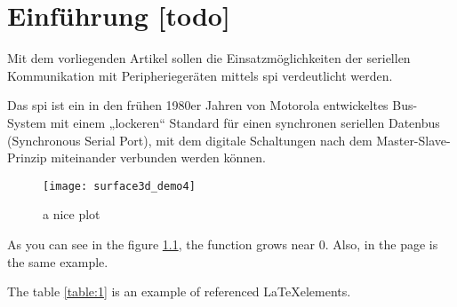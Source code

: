 \begin{comment}
- \cite{kurth2003experimental}
	- Many tasks for which robots are seemingly well-suited require a high level of precision in localization before such application can occur in the eld. For ex-ample, a robot delivering mail in an oÆce building, moving plants in a greenhouse, or mapping an under-ground mine needs to maintain an accurate estimate of its location.
	- Originally intended as a means to track assets and people in an environment equipped with special RF transponders [13], we invert the paradigm by xing the tags in the environment and moving a transponder with a robot. In this paradigm, as the robot moves, it periodically sends out a query, and any tags within range respond by sending a reply.
	- The ad-vantage of such a method is that it does not require line of sight between tags and the mobile robot, mak-ing it useful in many environmental conditions that fail optical methods.
	- Note that, since each tag transmits a unique ID number, distance readings are automatically associated with the appropriate tags, so the data association problem is solved trivially.
	
\end{comment}



\chapter{Einführung [todo]}

Mit dem vorliegenden Artikel sollen die Einsatzmöglichkeiten der seriellen Kommunikation mit Peripheriegeräten mittels \gls{spi} verdeutlicht werden.

Das \gls{spi} ist ein in den frühen 1980er Jahren von Motorola entwickeltes Bus-System mit einem „lockeren“ Standard für einen synchronen seriellen Datenbus (Synchronous Serial Port), mit dem digitale Schaltungen nach dem Master-Slave-Prinzip miteinander verbunden werden können.

\begin{figure}[h]
    \centering
    \texttt{[image: surface3d\_demo4]}
    \caption{a nice plot}
    \label{fig:mesh1}
\end{figure}
 
As you can see in the figure \ref{fig:mesh1}, the function grows near 0. Also, in the page \pageref{fig:mesh1} is the same example.

The table \ref{table:1} is an example of referenced \LaTeX elements.
 

